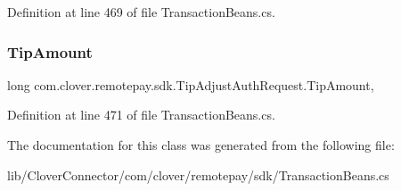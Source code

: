Definition at line 469 of file Transaction\+Beans.\+cs.

\mbox{\label{classcom_1_1clover_1_1remotepay_1_1sdk_1_1_tip_adjust_auth_request_a60cffdb64e162244a72fe5adb7b6fddd}} 
\subsubsection{\texorpdfstring{Tip\+Amount}{TipAmount}}
{\footnotesize\ttfamily long com.\+clover.\+remotepay.\+sdk.\+Tip\+Adjust\+Auth\+Request.\+Tip\+Amount\hspace{0.3cm}{\ttfamily [get]}, {\ttfamily [set]}}



Definition at line 471 of file Transaction\+Beans.\+cs.



The documentation for this class was generated from the following file\+:\begin{DoxyCompactItemize}
\item 
lib/\+Clover\+Connector/com/clover/remotepay/sdk/Transaction\+Beans.\+cs\end{DoxyCompactItemize}

